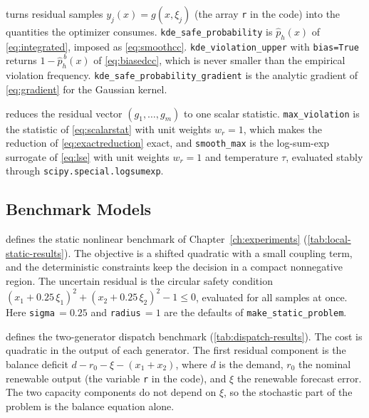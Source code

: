  turns residual samples $y_j(x)=g(x,\xi_j)$ (the array \texttt{r} in the
code) into the quantities
the optimizer consumes. \texttt{kde\_safe\_probability} is $\hat p_h(x)$ of
\cref{eq:integrated}, imposed as \cref{eq:smoothcc}.
\texttt{kde\_violation\_upper} with \texttt{bias=True} returns
$1-\hat p_h^{\,b}(x)$ of \cref{eq:biasedcc}, which is never smaller than the
empirical violation frequency. \texttt{kde\_safe\_probability\_gradient} is
the analytic gradient of \cref{eq:gradient} for the Gaussian kernel.


 reduces the residual vector $(g_1,\dots,g_m)$ to one scalar
statistic. \texttt{max\_violation} is the statistic of \cref{eq:scalarstat} with unit
weights $w_r=1$, which makes the reduction of \cref{eq:exactreduction} exact,
and \texttt{smooth\_max} is the log-sum-exp surrogate of
\cref{eq:lse} with unit weights $w_r=1$ and temperature $\tau$, evaluated stably
through \texttt{scipy.special.logsumexp}.


\subsection{Benchmark Models}

 defines the static nonlinear benchmark of
Chapter~\ref{ch:experiments} (\cref{tab:local-static-results}). The objective is a
shifted quadratic with a small coupling term, and the deterministic constraints
keep the decision in a compact nonnegative region. The uncertain residual is
the circular safety condition
$(x_1+0.25\,\xi_1)^2+(x_2+0.25\,\xi_2)^2-1\leq0$, evaluated for all samples at
once. Here \texttt{sigma}$\,=0.25$ and \texttt{radius}$\,=1$ are the defaults of
\texttt{make\_static\_problem}.


 defines the two-generator dispatch benchmark
(\cref{tab:dispatch-results}). The cost is quadratic in the output of each
generator. The first residual component is the balance deficit
$d-r_0-\xi-(x_1+x_2)$, where $d$ is the demand, $r_0$ the nominal renewable
output (the variable \texttt{r} in the code), and $\xi$ the renewable forecast
error. The two capacity components do
not depend on $\xi$, so the stochastic part of the problem is the balance
equation alone.

